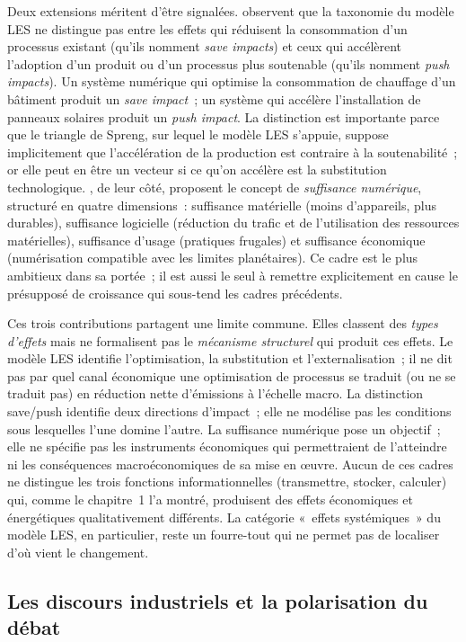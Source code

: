 Deux extensions méritent d'être signalées. \textcite{townsend_digital_2018} observent que la taxonomie du modèle LES ne distingue pas entre les effets qui réduisent la consommation d'un processus existant (qu'ils nomment \emph{save impacts}) et ceux qui accélèrent l'adoption d'un produit ou d'un processus plus soutenable (qu'ils nomment \emph{push impacts}). Un système numérique qui optimise la consommation de chauffage d'un bâtiment produit un \emph{save impact}~; un système qui accélère l'installation de panneaux solaires produit un \emph{push impact}. La distinction est importante parce que le triangle de Spreng, sur lequel le modèle LES s'appuie, suppose implicitement que l'accélération de la production est contraire à la soutenabilité~; or elle peut en être un vecteur si ce qu'on accélère est la substitution technologique. \textcite{santarius_digital_2022}, de leur côté, proposent le concept de \emph{suffisance numérique}, structuré en quatre dimensions~: suffisance matérielle (moins d'appareils, plus durables), suffisance logicielle (réduction du trafic et de l'utilisation des ressources matérielles), suffisance d'usage (pratiques frugales) et suffisance économique (numérisation compatible avec les limites planétaires). Ce cadre est le plus ambitieux dans sa portée~; il est aussi le seul à remettre explicitement en cause le présupposé de croissance qui sous-tend les cadres précédents.

Ces trois contributions partagent une limite commune. Elles classent des \emph{types d'effets} mais ne formalisent pas le \emph{mécanisme structurel} qui produit ces effets. Le modèle LES identifie l'optimisation, la substitution et l'externalisation~; il ne dit pas par quel canal économique une optimisation de processus se traduit (ou ne se traduit pas) en réduction nette d'émissions à l'échelle macro. La distinction save/push identifie deux directions d'impact~; elle ne modélise pas les conditions sous lesquelles l'une domine l'autre. La suffisance numérique pose un objectif~; elle ne spécifie pas les instruments économiques qui permettraient de l'atteindre ni les conséquences macroéconomiques de sa mise en œuvre. Aucun de ces cadres ne distingue les trois fonctions informationnelles (transmettre, stocker, calculer) qui, comme le chapitre~1 l'a montré, produisent des effets économiques et énergétiques qualitativement différents. La catégorie «~effets systémiques~» du modèle LES, en particulier, reste un fourre-tout qui ne permet pas de localiser d'où vient le changement.


\subsection{Les discours industriels et la polarisation du débat}\label{subsec:claims}

